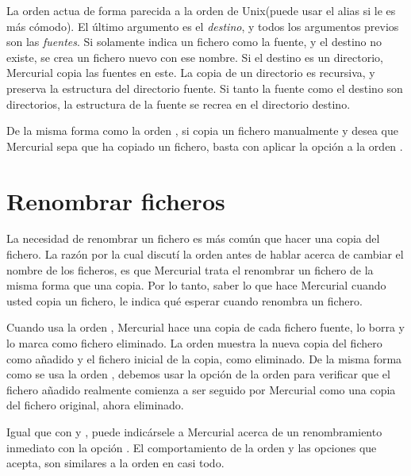 La orden  actua de forma parecida a la orden 
de Unix(puede usar el alias  si le es más cómodo).  El
último argumento es el \emph{destino}, y todos los argumentos previos
son las \emph{fuentes}.  Si solamente indica un fichero como la
fuente, y el destino no existe, se crea un fichero nuevo con ese nombre.
Si el destino es un directorio, Mercurial copia las fuentes en este.
La copia de un directorio es recursiva, y preserva la estructura del
directorio fuente.
Si tanto la fuente como el destino son directorios, la estructura de
la fuente se recrea en el directorio destino.

De la misma forma como la orden , si copia un fichero
manualmente y desea que Mercurial sepa que ha copiado un fichero,
basta con aplicar la opción  a la orden 
.

\section{Renombrar ficheros}

La necesidad de renombrar un fichero es más común que hacer una copia
del fichero.  La razón por la cual discutí la orden  antes
de hablar acerca de cambiar el nombre de los ficheros, es que
Mercurial trata el renombrar un fichero de la misma forma que una
copia.  Por lo tanto, saber lo que hace Mercurial cuando usted copia
un fichero, le indica qué esperar cuando renombra un fichero.

Cuando usa la orden , Mercurial hace una copia de cada
fichero fuente, lo borra y lo marca como fichero eliminado.
La orden  muestra la nueva copia del fichero como
añadido y el fichero inicial de la copia, como eliminado.
De la misma forma como se usa la orden , debemos usar la
opción  de la orden  para verificar
que el fichero añadido realmente comienza a  ser seguido por Mercurial
como una copia del fichero original, ahora eliminado.

Igual que con  y , puede indicársele a
Mercurial acerca de un renombramiento inmediato con la opción
.   El comportamiento de la orden
 y las opciones que acepta, son similares a la orden
 en casi todo.

